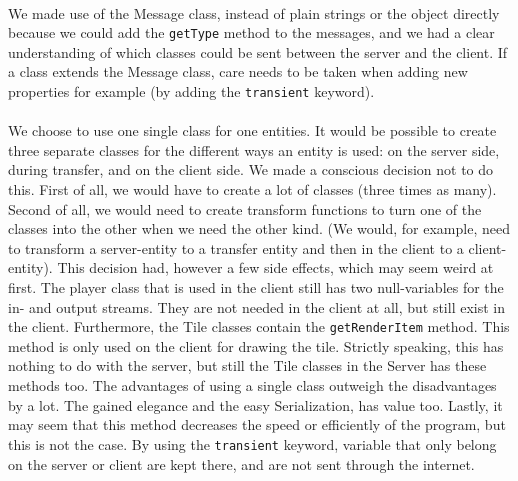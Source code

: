 \documentclass[../main.tex]{subfiles}
\begin{document}
    \paragraph{}
    We made use of the Message class, instead of plain strings or the object directly because we could add the \texttt{getType} method to the messages, and we had a clear understanding of which classes could be sent between the server and the client. If a class extends the Message class, care needs to be taken when adding new properties for example (by adding the \texttt{transient} keyword).
    \paragraph{}
    We choose to use one single class for one entities. It would be possible to create three separate classes for the different ways an entity is used: on the server side, during transfer, and on the client side. We made a conscious decision not to do this. First of all, we would have to create a lot of classes (three times as many). Second of all, we would need to create transform functions to turn one of the classes into the other when we need the other kind. (We would, for example, need to transform a server-entity to a transfer entity and then in the client to a client-entity). This decision had, however a few side effects, which may seem weird at first. The player class that is used in the client still has two null-variables for the in- and output streams. They are not needed in the client at all, but still exist in the client. Furthermore, the Tile classes contain the \texttt{getRenderItem} method. This method is only used on the client for drawing the tile. Strictly speaking, this has nothing to do with the server, but still the Tile classes in the Server has these methods too. The advantages of using a single class outweigh the disadvantages by a lot. The gained elegance and the easy Serialization, has value too. Lastly, it may seem that this method decreases the speed or efficiently of the program, but this is not the case. By  using the \texttt{transient} keyword, variable that only belong on the server or client are kept there, and are not sent through the internet.
    \paragraph{}
    
\end{document}
